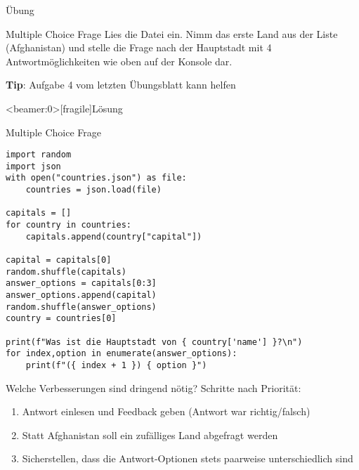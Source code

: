 
\begin{frame}{Übung}

\begin{block}{Multiple Choice Frage}
\vspace{2pt}
Lies die Datei  ein. Nimm das erste Land aus der Liste (Afghanistan) und stelle die Frage nach der Hauptstadt mit 4 Antwortmöglichkeiten wie oben auf der Konsole dar. 

\small{\textbf{Tip}: Aufgabe 4 vom letzten Übungsblatt kann helfen}
\end{block}
\end{frame}


\begin{frame}<beamer:0>[fragile]{Lösung}
\begin{solutionblock}{Multiple Choice Frage}
\begin{verbatim}
import random
import json
with open("countries.json") as file: 
    countries = json.load(file)

capitals = []
for country in countries: 
    capitals.append(country["capital"])

capital = capitals[0]
random.shuffle(capitals)
answer_options = capitals[0:3]
answer_options.append(capital)
random.shuffle(answer_options)
country = countries[0]

print(f"Was ist die Hauptstadt von { country['name'] }?\n")
for index,option in enumerate(answer_options): 
    print(f"({ index + 1 }) { option }")

\end{verbatim}
\end{solutionblock}
\end{frame}



\begin{frame}
\begin{block}{Welche Verbesserungen sind dringend nötig?}
	\vspace{2pt}
\pause 
Schritte nach Priorität: 
\pause 
	\begin{enumerate}[<+->]
		\item Antwort einlesen und Feedback geben (Antwort war richtig/falsch)
		\item Statt Afghanistan soll ein zufälliges Land abgefragt werden
		\item Sicherstellen, dass die Antwort-Optionen stets paarweise unterschiedlich sind
	\end{enumerate}	
\end{block}
\end{frame}


